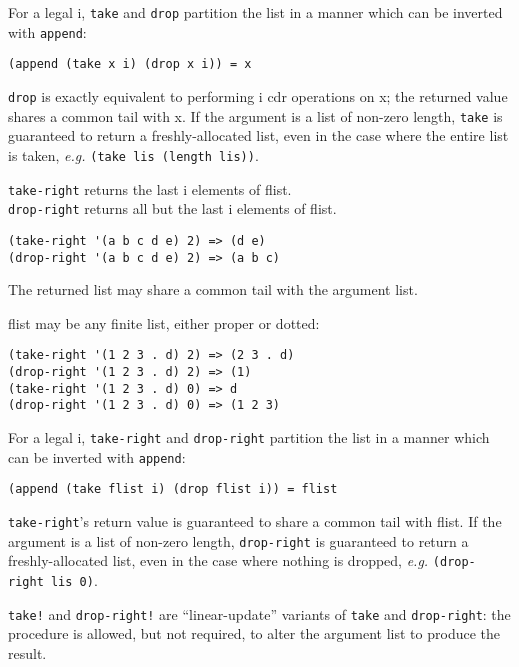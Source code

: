 \begin{description}
For a legal i, \texttt{take} and \texttt{drop} partition the list in a
manner which can be inverted with \texttt{append}:

\begin{verbatim}
(append (take x i) (drop x i)) = x
\end{verbatim}

\texttt{drop} is exactly equivalent to performing i cdr operations on x;
the returned value shares a common tail with x. If the argument is a
list of non-zero length, \texttt{take} is guaranteed to return a
freshly-allocated list, even in the case where the entire list is taken,
\emph{e.g.} \texttt{(take\ lis\ (length\ lis))}.
\item[ \href{}{} \texttt{take-right} flist i -\textgreater{} object\\
\href{}{} \texttt{drop-right} flist i -\textgreater{} list ]
\texttt{take-right} returns the last i elements of flist.\\
\texttt{drop-right} returns all but the last i elements of flist.

\begin{verbatim}
(take-right '(a b c d e) 2) => (d e)
(drop-right '(a b c d e) 2) => (a b c)
\end{verbatim}

The returned list may share a common tail with the argument list.

flist may be any finite list, either proper or dotted:

\begin{verbatim}
(take-right '(1 2 3 . d) 2) => (2 3 . d)
(drop-right '(1 2 3 . d) 2) => (1)
(take-right '(1 2 3 . d) 0) => d
(drop-right '(1 2 3 . d) 0) => (1 2 3)
\end{verbatim}

For a legal i, \texttt{take-right} and \texttt{drop-right} partition the
list in a manner which can be inverted with \texttt{append}:

\begin{verbatim}
(append (take flist i) (drop flist i)) = flist
\end{verbatim}

\texttt{take-right}'s return value is guaranteed to share a common tail
with flist. If the argument is a list of non-zero length,
\texttt{drop-right} is guaranteed to return a freshly-allocated list,
even in the case where nothing is dropped, \emph{e.g.}
\texttt{(drop-right\ lis\ 0)}.
\item[ \href{}{} \texttt{take!} x i -\textgreater{} list\\
\href{}{} \texttt{drop-right!} flist i -\textgreater{} list ]
\texttt{take!} and \texttt{drop-right!} are ``linear-update'' variants
of \texttt{take} and \texttt{drop-right}: the procedure is allowed, but
not required, to alter the argument list to produce the result.


\end{description}
